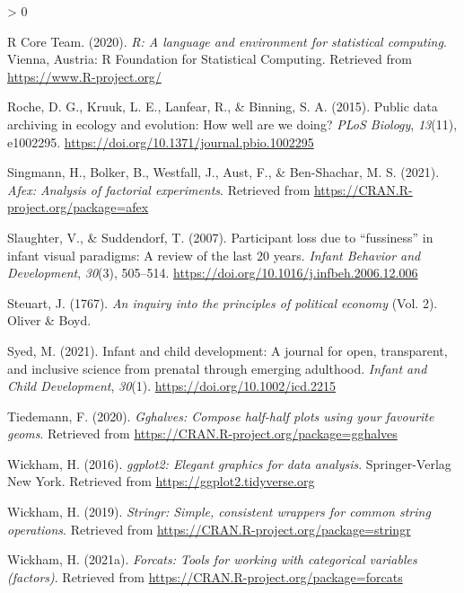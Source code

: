 \documentclass[
  english,
  man,floatsintext]{apa6}
\newlength{\cslhangindent}
\newenvironment{CSLReferences}[2] %
 {%
  \setlength{\parindent}{0pt}
  \ifodd #1 \everypar{\setlength{\hangindent}{\cslhangindent}}\ignorespaces\fi
  \ifnum #2 > 0
  \setlength{\parskip}{#2\baselineskip}
  \fi
 }%
 {}
\begin{document}
\begin{CSLReferences}{1}{0}
\leavevmode\hypertarget{ref-R-base}{}%
R Core Team. (2020). \emph{R: A language and environment for statistical computing}. Vienna, Austria: R Foundation for Statistical Computing. Retrieved from \url{https://www.R-project.org/}

\leavevmode\hypertarget{ref-roche2015public}{}%
Roche, D. G., Kruuk, L. E., Lanfear, R., \& Binning, S. A. (2015). Public data archiving in ecology and evolution: How well are we doing? \emph{PLoS Biology}, \emph{13}(11), e1002295. \url{https://doi.org/10.1371/journal.pbio.1002295}

\leavevmode\hypertarget{ref-R-afex}{}%
Singmann, H., Bolker, B., Westfall, J., Aust, F., \& Ben-Shachar, M. S. (2021). \emph{Afex: Analysis of factorial experiments}. Retrieved from \url{https://CRAN.R-project.org/package=afex}

\leavevmode\hypertarget{ref-slaughter2007participant}{}%
Slaughter, V., \& Suddendorf, T. (2007). Participant loss due to {``fussiness''} in infant visual paradigms: A review of the last 20 years. \emph{Infant Behavior and Development}, \emph{30}(3), 505--514. \url{https://doi.org/10.1016/j.infbeh.2006.12.006}

\leavevmode\hypertarget{ref-steuart1767inquiry}{}%
Steuart, J. (1767). \emph{An inquiry into the principles of political economy} (Vol. 2). Oliver \& Boyd.

\leavevmode\hypertarget{ref-syed2021infant}{}%
Syed, M. (2021). Infant and child development: A journal for open, transparent, and inclusive science from prenatal through emerging adulthood. \emph{Infant and Child Development}, \emph{30}(1). \url{https://doi.org/10.1002/icd.2215}

\leavevmode\hypertarget{ref-R-gghalves}{}%
Tiedemann, F. (2020). \emph{Gghalves: Compose half-half plots using your favourite geoms}. Retrieved from \url{https://CRAN.R-project.org/package=gghalves}

\leavevmode\hypertarget{ref-R-ggplot2}{}%
Wickham, H. (2016). \emph{ggplot2: Elegant graphics for data analysis}. Springer-Verlag New York. Retrieved from \url{https://ggplot2.tidyverse.org}

\leavevmode\hypertarget{ref-R-stringr}{}%
Wickham, H. (2019). \emph{Stringr: Simple, consistent wrappers for common string operations}. Retrieved from \url{https://CRAN.R-project.org/package=stringr}

\leavevmode\hypertarget{ref-R-forcats}{}%
Wickham, H. (2021a). \emph{Forcats: Tools for working with categorical variables (factors)}. Retrieved from \url{https://CRAN.R-project.org/package=forcats}


\end{CSLReferences}
\end{document}
